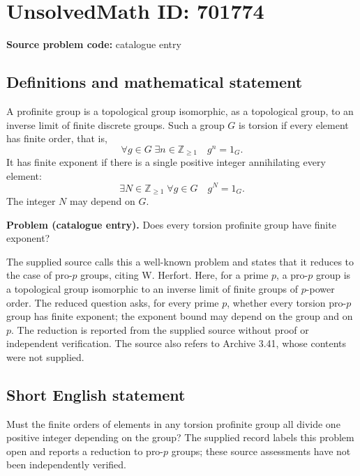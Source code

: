 \documentclass[11pt]{article}
\newcommand{\Z}{\mathbb{Z}}
\begin{document}
\section*{UnsolvedMath ID: 701774}
\textbf{Source problem code:} catalogue entry
\subsection{Definitions and mathematical statement}
A profinite group is a topological group isomorphic, as a topological group, to an inverse limit of finite discrete groups. Such a group \(G\) is torsion if every element has finite order, that is,
\[
\forall g\in G\;\exists n\in\Z_{\geq 1}\quad g^n=1_G.
\]
It has finite exponent if there is a single positive integer annihilating every element:
\[
\exists N\in\Z_{\geq 1}\;\forall g\in G\quad g^N=1_G.
\]
The integer \(N\) may depend on \(G\).

\textbf{Problem (catalogue entry).} Does every torsion profinite group have finite exponent?

The supplied source calls this a well-known problem and states that it reduces to the case of pro-\(p\) groups, citing W. Herfort. Here, for a prime \(p\), a pro-\(p\) group is a topological group isomorphic to an inverse limit of finite groups of \(p\)-power order. The reduced question asks, for every prime \(p\), whether every torsion pro-\(p\) group has finite exponent; the exponent bound may depend on the group and on \(p\). The reduction is reported from the supplied source without proof or independent verification. The source also refers to Archive 3.41, whose contents were not supplied.
\subsection{Short English statement}
Must the finite orders of elements in any torsion profinite group all divide one positive integer depending on the group? The supplied record labels this problem open and reports a reduction to pro-\(p\) groups; these source assessments have not been independently verified.
\end{document}
